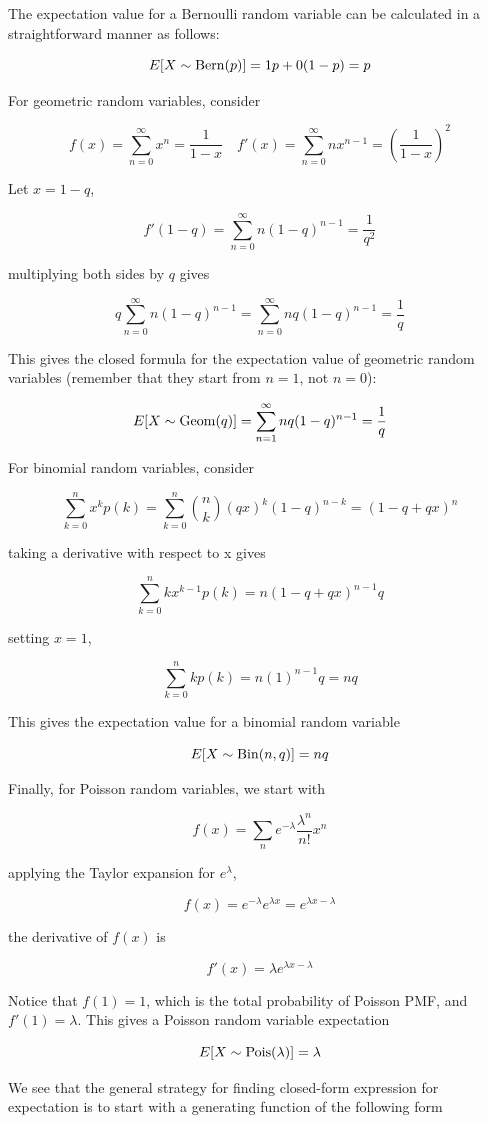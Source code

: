 The expectation value for a Bernoulli random variable can be calculated in a straightforward manner as follows:

$$E[X\sim\operatorname{Bern}(p)]=1p+0(1-p)=p$$

For geometric random variables, consider

$$f(x)=\sum_{n=0}^\infty x^n = \frac{1}{{1-x}} \quad f'(x)=\sum_{n=0}^\infty nx^{n-1} = \left(\frac{1}{{1-x}}\right)^2$$

Let $x=1-q$,

$$f'(1-q)=\sum_{n=0}^\infty n(1-q)^{n-1} = \frac{1}{q^2}$$

multiplying both sides by $q$ gives

$$q\sum_{n=0}^\infty n(1-q)^{n-1} = \sum_{n=0}^\infty nq(1-q)^{n-1} = \frac{1}{q}$$

This gives the closed formula for the expectation value of geometric random variables (remember that they start from $n=1$, not $n=0$):

$$E[X\sim\operatorname{Geom}(q)]=\sum_{n=1}^\infty nq(1-q)^{n-1}=\frac1q$$

For binomial random variables, consider

$$\sum_{k=0}^n x^k p(k) = \sum_{k=0}^n {n \choose k} (qx)^k (1-q)^{n-k}=(1-q+qx)^n$$

taking a derivative with respect to x gives

$$\sum_{k=0}^n kx^{k-1} p(k) =n(1-q+qx)^{n-1}q$$

setting $x=1$,

$$\sum_{k=0}^n k p(k) =n(1)^{n-1}q=nq$$

This gives the expectation value for a binomial random variable

$$E[X\sim\operatorname{Bin}(n,q)]=nq$$

Finally, for Poisson random variables, we start with

$$f(x)=\sum_n e^{-\lambda} \frac{\lambda^n}{n!}x^n$$

applying the Taylor expansion for $e^\lambda$,

$$f(x)=e^{-\lambda}e^{\lambda x}=e^{\lambda x-\lambda}$$

the derivative of $f(x)$ is

$$f'(x)=\lambda e^{\lambda x-\lambda}$$

Notice that $f(1)=1$, which is the total probability of Poisson PMF, and $f'(1)=\lambda$. This gives a Poisson random variable expectation

$$E[X\sim\operatorname{Pois}(\lambda)]=\lambda$$

We see that the general strategy for finding closed-form expression for expectation is to start with a generating function of the following form

